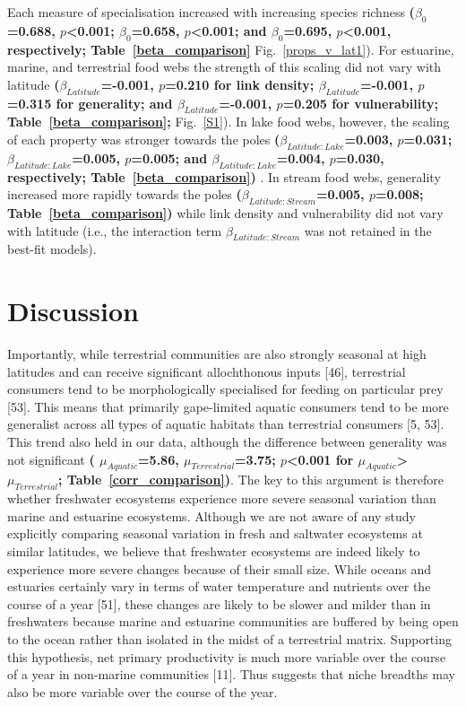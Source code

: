 \documentclass[12pt]{article}
\begin{document}
\begin{spacing}{2.0}
    Each measure of specialisation increased with increasing
    species richness 
    \textbf{($\beta_0$=0.688, $p$\textless0.001; $\beta_0$=0.658,
    $p$\textless0.001; and $\beta_0$=0.695, $p$\textless0.001, respectively; Table~\ref{beta_comparison}}
    Fig.~\ref{props_v_lat1}). For estuarine, marine, and terrestrial food webs the
    strength of this scaling did not vary with latitude
    \textbf{($\beta_{Latitude}$=-0.001, $p$=0.210 for link density;
    $\beta_{Latitude}$=-0.001, $p$=0.315 for generality; and
    $\beta_{Latitude}$=-0.001, $p$=0.205 for vulnerability; Table~\ref{beta_comparison};} 
    Fig.~\ref{S1}). In
    lake food webs, however, the scaling of each property was stronger towards
    the poles 
    \textbf{($\beta_{Latitude:Lake}$=0.003, $p$=0.031;
    $\beta_{Latitude:Lake}$=0.005, $p$=0.005; and
    $\beta_{Latitude:Lake}$=0.004, $p$=0.030, respectively; Table~\ref{beta_comparison})}
    . In stream food
    webs, generality increased more rapidly towards the poles
    \textbf{($\beta_{Latitude:Stream}$=0.005, $p$=0.008; Table~\ref{beta_comparison})}
    while link density and
    vulnerability did not vary with latitude (i.e., the interaction term 
    $\beta_{Latitude:Stream}$ was not retained in the best-fit models).    


\section*{Discussion}

  Importantly, while terrestrial communities are also strongly seasonal at
  high latitudes and can receive significant allochthonous
  inputs [46], terrestrial consumers tend to be
  morphologically specialised for feeding on particular prey [53].
  This means that primarily gape-limited aquatic consumers tend to be more
  generalist across all types of aquatic habitats than terrestrial 
  consumers [5, 53]. This trend also held in our data, although the difference between generality was not significant \textbf{(
    $\mu_{Aquatic}$=5.86, $\mu_{Terrestrial}$=3.75; $p$\textless0.001 for 
    $\mu_{Aquatic}$\textgreater$\mu_{Terrestrial}$; Table~\ref{corr_comparison})}. 
  The key to this argument is therefore whether freshwater ecosystems experience
  more severe seasonal variation than marine and estuarine ecosystems. Although
  we are not aware of any study explicitly comparing seasonal variation in
  fresh and saltwater ecosystems at similar latitudes, we believe that freshwater 
  ecosystems are indeed likely to experience more severe changes because of their small size.
  While oceans and estuaries certainly vary in terms of water temperature and
  nutrients over the course of a year [51], these changes are likely to be slower
  and milder than in freshwaters because marine and estuarine communities are buffered 
  by being open to the ocean rather than isolated in the midst of a terrestrial matrix. 
  Supporting this hypothesis, net primary productivity is much more variable over the course of a year 
  in non-marine communities [11]. Thus suggests that niche breadths may also be 
  more variable over the course of the year. 




\end{spacing}
\end{document}
